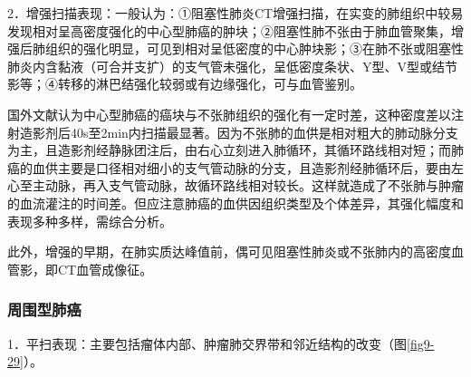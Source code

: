 2．增强扫描表现：一般认为：①阻塞性肺炎CT增强扫描，在实变的肺组织中较易发现相对呈高密度强化的中心型肺癌的肿块；②阻塞性肺不张由于肺血管聚集，增强后肺组织的强化明显，可见到相对呈低密度的中心肿块影；③在肺不张或阻塞性肺炎内含黏液（可合并支扩）的支气管未强化，呈低密度条状、Y型、V型或结节影等；④转移的淋巴结强化较弱或有边缘强化，可与血管鉴别。

国外文献认为中心型肺癌的癌块与不张肺组织的强化有一定时差，这种密度差以注射造影剂后40s至2min内扫描最显著。因为不张肺的血供是相对粗大的肺动脉分支为主，且造影剂经静脉团注后，由右心立刻进入肺循环，其循环路线相对短；而肺癌的血供主要是口径相对细小的支气管动脉的分支，且造影剂经肺循环后，要由左心至主动脉，再入支气管动脉，故循环路线相对较长。这样就造成了不张肺与肿瘤的血流灌注的时间差。但应注意肺癌的血供因组织类型及个体差异，其强化幅度和表现多种多样，需综合分析。

此外，增强的早期，在肺实质达峰值前，偶可见阻塞性肺炎或不张肺内的高密度血管影，即CT血管成像征。

\subsubsection{周围型肺癌}

1．平扫表现：主要包括瘤体内部、肿瘤肺交界带和邻近结构的改变（图\ref{fig9-29}）。



